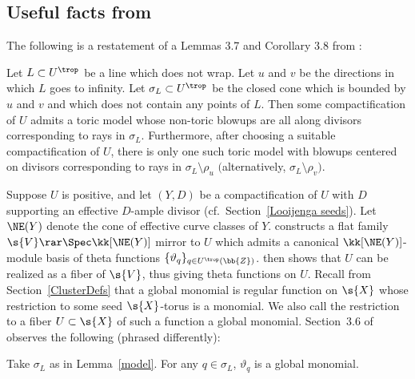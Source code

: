 \subsection{Useful facts from \cite{Man1}}\label{Man}
The following is a restatement of a Lemmas 3.7 and Corollary 3.8 from \cite{Man1}:

\begin{lem}\label{model}
Let $L\subset U^{\trop}$ be a line which does not wrap. Let $u$ and $v$ be the directions in which $L$ goes to infinity. Let $\sigma_L\subset U^{\trop}$ be the closed cone which is bounded by $u$ and $v$ and which does not contain any points of $L$. Then some compactification of $U$ admits a toric model whose non-toric blowups are all along divisors corresponding to rays in $\sigma_L$. Furthermore, after choosing a suitable compactification of $U$, there is only one such toric model with blowups centered on divisors corresponding to rays in $\sigma_L \setminus \rho_u$ $($alternatively, $\sigma_L \setminus \rho_v)$.
\end{lem}

Suppose $U$ is positive, and let $(Y,D)$ be a compactification of $U$ with $D$ supporting an effective $D$-ample divisor (cf.\ Section~\ref{Looijenga seeds}). Let $\NE(Y)$ denote the cone of effective curve classes of $Y$. \cite{GHK1} constructs a flat family $\s{V}\rar \Spec \kk[\NE(Y)]$ mirror to $U$ which admits a canonical $\kk[\NE(Y)]$-module basis of theta functions $\{\vartheta_q\}_{q\in U^{\trop}(\bb{Z})}$. \cite{GHK2} then shows that $U$ can be realized as a fiber of $\s{V}$, thus giving theta functions on $U$. Recall from Section~\ref{ClusterDefs} that a global monomial is regular function on $\s{X}$ whose restriction to some seed $\s{X}$-torus is a monomial. We also call the restriction to a fiber $U\subset \s{X}$ of such a function a global monomial. Section~3.6 of \cite{Man1} observes the following (phrased differently):

\begin{lem}\label{GlobalMonomial}Take $\sigma_L$ as in Lemma~{\rm \ref{model}}. For any $q\in \sigma_L$, $\vartheta_q$ is a global monomial.
\end{lem}

